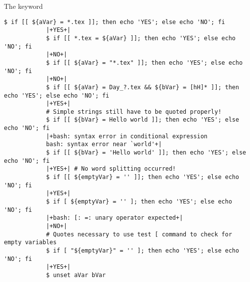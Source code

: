 \begin{frame}[fragile]{The \bash{[[} keyword}
\begin{onlyenv}
\begin{lstlisting}[style=MyBash, aboveskip=-1mm, style=oddnumbers, style=smaller, xleftmargin=1mm, xrightmargin=1mm]
            $ if [[ ${aVar} = *.tex ]]; then echo 'YES'; else echo 'NO'; fi
            |+YES+|
            $ if [[ *.tex = ${aVar} ]]; then echo 'YES'; else echo 'NO'; fi
            |+NO+|
            $ if [[ ${aVar} = "*.tex" ]]; then echo 'YES'; else echo 'NO'; fi
            |+NO+|
            $ if [[ ${aVar} = Day_?.tex && ${bVar} = [hH]* ]]; then echo 'YES'; else echo 'NO'; fi
            |+YES+|
            # Simple strings still have to be quoted properly!
            $ if [[ ${bVar} = Hello world ]]; then echo 'YES'; else echo 'NO'; fi
            |+bash: syntax error in conditional expression
            bash: syntax error near `world'+|
            $ if [[ ${bVar} = 'Hello world' ]]; then echo 'YES'; else echo 'NO'; fi
            |+YES+| # No word splitting occurred!
            $ if [[ ${emptyVar} = '' ]]; then echo 'YES'; else echo 'NO'; fi
            |+YES+|
            $ if [ ${emptyVar} = '' ]; then echo 'YES'; else echo 'NO'; fi
            |+bash: [: =: unary operator expected+|
            |+NO+|
            # Quotes necessary to use test [ command to check for empty variables
            $ if [ "${emptyVar}" = '' ]; then echo 'YES'; else echo 'NO'; fi
            |+YES+|
            $ unset aVar bVar
        \end{lstlisting}
    \end{onlyenv}
\end{frame}

